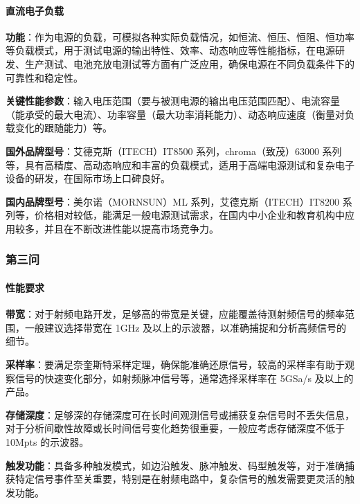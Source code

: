 \documentclass[./测控三级项目.tex]{subfiles} %
\begin{document}
			\paragraph{\qquad 直流电子负载}\par
			\textbf{功能}：作为电源的负载，可模拟各种实际负载情况，如恒流、恒压、恒阻、恒功率等负载模式，用于测试电源的输出特性、效率、动态响应等性能指标，在电源研发、生产测试、电池充放电测试等方面有广泛应用，确保电源在不同负载条件下的可靠性和稳定性。\par
			\textbf{关键性能参数}：输入电压范围（要与被测电源的输出电压范围匹配）、电流容量（能承受的最大电流）、功率容量（最大功率消耗能力）、动态响应速度（衡量对负载变化的跟随能力）等。\par
			\textbf{国外品牌型号}：艾德克斯（ITECH）IT8500 系列，chroma（致茂）63000 系列等，具有高精度、高动态响应和丰富的负载模式，适用于高端电源测试和复杂电子设备的研发，在国际市场上口碑良好。\par
			\textbf{国内品牌型号}：美尔诺（MORNSUN）ML 系列，艾德克斯（ITECH）IT8200 系列等，价格相对较低，能满足一般电源测试需求，在国内中小企业和教育机构中应用较多，并且在不断改进性能以提高市场竞争力。\par
			
		\subsubsection{第三问}
			\paragraph{\qquad 性能要求}\par
			\textbf{带宽}：对于射频电路开发，足够高的带宽是关键，应能覆盖待测射频信号的频率范围，一般建议选择带宽在 1GHz 及以上的示波器，以准确捕捉和分析高频信号的细节。\par
			\textbf{采样率}：要满足奈奎斯特采样定理，确保能准确还原信号，较高的采样率有助于观察信号的快速变化部分，如射频脉冲信号等，通常选择采样率在 5GSa/s 及以上的产品。\par
			\textbf{存储深度}：足够深的存储深度可在长时间观测信号或捕获复杂信号时不丢失信息，对于分析间歇性故障或长时间信号变化趋势很重要，一般应考虑存储深度不低于 10Mpts 的示波器。\par
			\textbf{触发功能}：具备多种触发模式，如边沿触发、脉冲触发、码型触发等，对于准确捕获特定信号事件至关重要，特别是在射频电路中，复杂信号的触发需要更灵活的触发功能。\par
\end{document}

